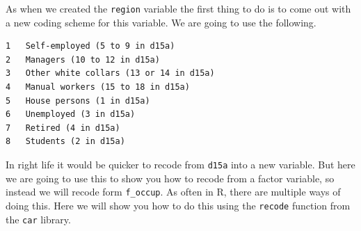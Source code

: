 \documentclass[]{book}
\theoremstyle{definition}
\theoremstyle{definition}
\theoremstyle{definition}
\theoremstyle{remark}
\begin{document}
As when we created the \texttt{region} variable the first thing to do is
to come out with a new coding scheme for this variable. We are going to
use the following.

\begin{verbatim}
1   Self-employed (5 to 9 in d15a)  
2   Managers (10 to 12 in d15a) 
3   Other white collars (13 or 14 in d15a)  
4   Manual workers (15 to 18 in d15a)   
5   House persons (1 in d15a)   
6   Unemployed (3 in d15a)  
7   Retired (4 in d15a) 
8   Students (2 in d15a)
\end{verbatim}

In right life it would be quicker to recode from \texttt{d15a} into a
new variable. But here we are going to use this to show you how to
recode from a factor variable, so instead we will recode form
\texttt{f\_occup}. As often in R, there are multiple ways of doing this.
Here we will show you how to do this using the \texttt{recode} function
from the \texttt{car} library.
\end{document}
